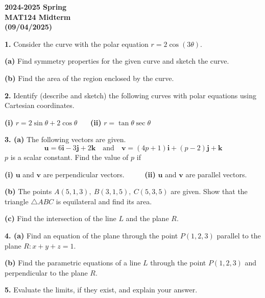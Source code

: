 \documentclass{article}
\begin{document}
\pagestyle{empty}
\large

\begin{center}
\textbf{2024-2025 Spring \\MAT124 Midterm\\(09/04/2025)}
\end{center}

\textbf{1.} Consider the curve with the polar equation $r=2\cos(3\theta)$.

\textbf{(a)} Find symmetry properties for the given curve and sketch the curve.

\textbf{(b)} Find the area of the region enclosed by the curve.

\vspace{1em}

\textbf{2.} Identify (describe and sketch) the following curves with polar equations using Cartesian coordinates.

\textbf{(i)} $r=2\sin\theta +2\cos\theta$ \ \ \ \textbf{(ii)} $r=\tan\theta\sec\theta$

\vspace{1em}

\textbf{3. (a)} The following vectors are given.
\[\mathbf{u}=6\mathbf{i}-3\mathbf{j}+2\mathbf{k}\quad\text{and}\quad\mathbf{v}=(4{p}+1)\mathbf{i}+({p}-2)\mathbf{j}+\mathbf{k}\]
${p}$ is a scalar constant. Find the value of ${p}$ if

\textbf{(i)} $\mathbf{u}$ and $\mathbf{v}$ are perpendicular vectors. \ \ \ \ \ \textbf{(ii)} $\mathbf{u}$ and $\mathbf{v}$ are parallel vectors.

\vspace{0.5em}

\textbf{(b)} The points $A(5,1,3),\:B(3,1,5),\:C(5,3,5)$ are given. Show that the triangle $\triangle{ABC}$ is equilateral and find its area.

\textbf{(c)} Find the intersection of the line $L$ and the plane $R$.

\vspace{1em}

\textbf{4. (a)} Find an equation of the plane through the point $P(1,2,3)$ parallel to the plane $R: x+y+z=1$.

\textbf{(b)} Find the parametric equations of a line $L$ through the point $P(1,2,3)$ and perpendicular to the plane $R$.

\vspace{1em}

\textbf{5.} Evaluate the limits, if they exist, and explain your answer.
\end{document}
